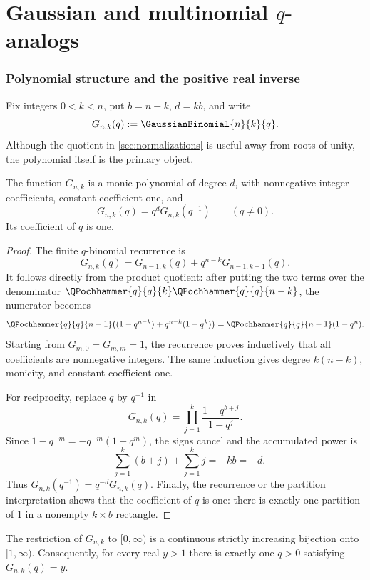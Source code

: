 \part{\texorpdfstring{Gaussian and multinomial \(q\)-analogs}{Gaussian and multinomial q-analogs}}

\section{Polynomial structure and the positive real inverse}
\label{sec:gaussian-polynomial}

Fix integers \(0<k<n\), put \(b=n-k\), \(d=kb\), and write
\[
  G_{n,k}(q):=\GaussianBinomial{n}{k}{q}.
\]
Although the quotient in \cref{sec:normalizations} is useful away from roots
of unity, the polynomial itself is the primary object.

\begin{proposition}
\label{prop:gq-positive-palindromic}
The function \(G_{n,k}\) is a monic polynomial of degree \(d\), with
nonnegative integer coefficients, constant coefficient one, and
\[
  G_{n,k}(q)=q^dG_{n,k}(q^{-1})\qquad(q\ne0).
\]
Its coefficient of \(q\) is one.
\end{proposition}

\begin{proof}
The finite \(q\)-binomial recurrence is
\[
  G_{n,k}(q)
  =G_{n-1,k}(q)+q^{n-k}G_{n-1,k-1}(q).
\]
It follows directly from the product quotient: after putting the two terms
over the denominator
\(\QPochhammer{q}{q}{k}\QPochhammer{q}{q}{n-k}\), the numerator becomes
\[
  \QPochhammer{q}{q}{n-1}\bigl((1-q^{n-k})+q^{n-k}(1-q^k)\bigr)
  =\QPochhammer{q}{q}{n-1}(1-q^n).
\]
Starting from \(G_{m,0}=G_{m,m}=1\), the recurrence proves inductively that
all coefficients are nonnegative integers.  The same induction gives degree
\(k(n-k)\), monicity, and constant coefficient one.

For reciprocity, replace \(q\) by \(q^{-1}\) in
\[
  G_{n,k}(q)=\prod_{j=1}^{k}\frac{1-q^{b+j}}{1-q^j}.
\]
Since \(1-q^{-m}=-q^{-m}(1-q^m)\), the signs cancel and the accumulated
power is
\[
  -\sum_{j=1}^{k}(b+j)+\sum_{j=1}^{k}j=-kb=-d.
\]
Thus \(G_{n,k}(q^{-1})=q^{-d}G_{n,k}(q)\).
Finally, the recurrence or the partition interpretation shows that the
coefficient of \(q\) is one: there is exactly one partition of \(1\) in a
nonempty \(k\times b\) rectangle.
\end{proof}

\begin{theorem}
\label{thm:gq-positive-inverse}
The restriction of \(G_{n,k}\) to \([0,\infty)\) is a continuous strictly
increasing bijection onto \([1,\infty)\).  Consequently, for every real
\(y>1\) there is exactly one \(q>0\) satisfying \(G_{n,k}(q)=y\).
\end{theorem}

